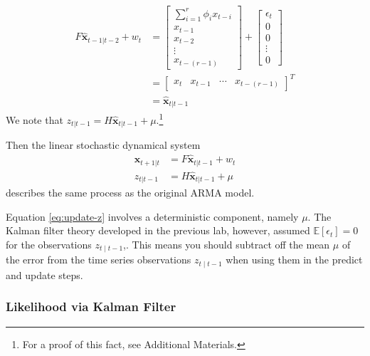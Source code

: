 \begin{align}
    F\hat{\textbf{x}}_{t-1|t-2}+w_{t}&=\begin{bmatrix}\sum_{i=1}^r\phi_ix_{t-i}\\
                                x_{t-1}\\
                                x_{t-2}\\
                                \vdots\\
                                x_{t-(r-1)}
                  \end{bmatrix}+\begin{bmatrix}\epsilon_t\\0\\0\\\vdots\\0\end{bmatrix}\\
                &=\begin{bmatrix}x_t&x_{t-1}&\cdots&x_{t-(r-1)}\end{bmatrix}^T\\
                &=\hat{\textbf{x}}_{t|t-1}
\end{align}
We note that $z_{t|t-1}=H\hat{\textbf{x}}_{t|t-1}+\mu$.\footnote{
For a proof of this fact, see Additional Materials.}

Then the linear stochastic
dynamical system
\begin{align}
    \hat{\textbf{x}}_{t+1|t} &= F\hat{\textbf{x}}_{t|t-1} + w_t\\
    z_{t|t-1} &= H\hat{\textbf{x}}_{t|t-1} + \mu
    \label{eq:update-z}
\end{align}
describes the same process as the original $\text{ARMA}$ model.

\begin{info}
Equation \ref{eq:update-z} involves a deterministic component, namely $\mu$.
The Kalman filter theory developed in the previous lab, however, assumed $\mathbb{E}[\epsilon_t]=0$ for the observations $z_{t\mid t-1}$,.
This means you should subtract off the mean
$\mu$ of the error from the time series observations $z_{t\mid t-1}$ when using them in the predict and update
steps.
\end{info}

\subsubsection*{Likelihood via Kalman Filter}

